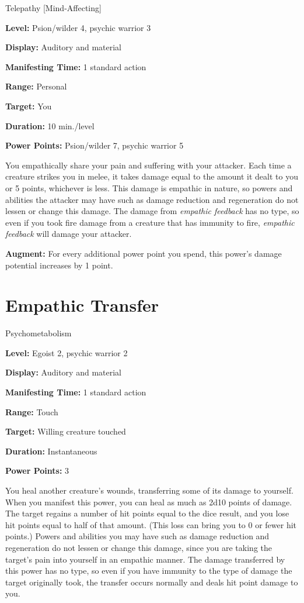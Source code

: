 \documentclass{article}
\begin{document}
Telepathy [Mind-Affecting]

\textbf{Level:} Psion/wilder 4, psychic warrior 3

\textbf{Display:} Auditory and material

\textbf{Manifesting Time:} 1 standard action

\textbf{Range:} Personal

\textbf{Target:} You

\textbf{Duration:} 10 min./level

\textbf{Power Points:} Psion/wilder 7, psychic warrior 5

You empathically share your pain and suffering with your attacker. Each time a 
creature strikes you in melee, it takes damage equal to the amount it dealt to 
you or 5 points, whichever is less. This damage is empathic in nature, so powers 
and abilities the attacker may have such as damage reduction and regeneration do 
not lessen or change this damage. The damage from \textit{empathic feedback }has 
no type, so even if you took fire damage from a creature that has immunity to fire, 
\textit{empathic feedback }will damage your attacker.

\textbf{Augment:} For every additional power point you spend, this power's damage 
potential increases by 1 point.

\vspace{12pt}
\section*{Empathic Transfer}

Psychometabolism

\textbf{Level:} Egoist 2, psychic warrior 2

\textbf{Display:} Auditory and material

\textbf{Manifesting Time:} 1 standard action

\textbf{Range:} Touch

\textbf{Target:} Willing creature touched

\textbf{Duration:} Instantaneous

\textbf{Power Points:} 3

You heal another creature's wounds, transferring some of its damage to yourself. 
When you manifest this power, you can heal as much as 2d10 points of damage. The 
target regains a number of hit points equal to the dice result, and you lose hit 
points equal to half of that amount. (This loss can bring you to 0 or fewer hit 
points.) Powers and abilities you may have such as damage reduction and regeneration 
do not lessen or change this damage, since you are taking the target's pain into 
yourself in an empathic manner. The damage transferred by this power has no type, 
so even if you have immunity to the type of damage the target originally took, 
the transfer occurs normally and deals hit point damage to you.
\end{document}
